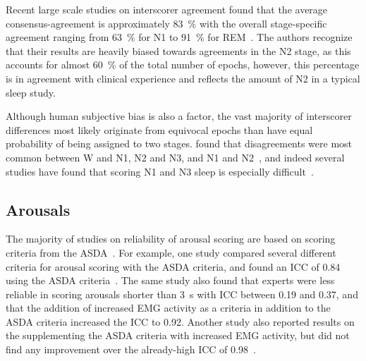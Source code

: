             Recent large scale studies on interscorer agreement found that the average consensus-agreement is approximately \SI{83}{\percent} with the overall stage-specific agreement ranging from \SI{63}{\percent} for N1 to \SI{91}{\percent} for REM~\cite{Rosenberg2013}.
            The authors recognize that their results are heavily biased towards agreements in the N2 stage, as this accounts for almost \SI{60}{\percent} of the total number of epochs, however, this percentage is in agreement with clinical experience and reflects the amount of N2 in a typical sleep study.
            
            Although human subjective bias is also a factor, the vast majority of interscorer differences most likely originate from equivocal epochs than have equal probability of being assigned to two stages. 
            \citeauthor{Younes2016} found that disagreements were most common between W and N1, N2 and N3, and N1 and N2~\cite{Younes2016}, and indeed several studies have found that scoring N1 and N3 sleep is especially difficult~\cite{Danker-Hopfe2004,Rosenberg2013,Zhang2015a, Younes2018}.
            
        
        \subsection{Arousals}\label{sec:challenges-arousals}
        
            The majority of studies on reliability of arousal scoring are based on scoring criteria from the \ac{ASDA}~\cite{Bonnet2007}.
            For example, one study compared several different criteria for arousal scoring with the \ac{ASDA} criteria, and found an \ac{ICC} of 0.84 using the \ac{ASDA} criteria~\cite{Loredo1999}. 
            The same study also found that experts were less reliable in scoring arousals shorter than \SI{3}{\second} with \ac{ICC} between 0.19 and 0.37, and that the addition of increased \ac{EMG} activity as a criteria in addition to the \ac{ASDA} criteria increased the \ac{ICC} to 0.92.
            Another study also reported results on the supplementing the \ac{ASDA} criteria with increased \ac{EMG} activity, but did not find any improvement over the already-high \ac{ICC} of 0.98~\cite{Smurra2001}.
            
